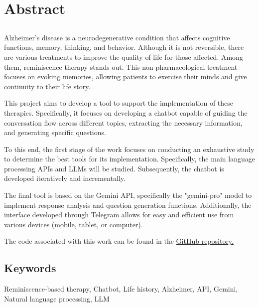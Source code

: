 \chapter*{Abstract}
\section*{\tituloPortadaVal}
Alzheimer's disease is a neurodegenerative condition that affects cognitive functions, memory, thinking, and behavior. Although it is not reversible, there are various treatments to improve the quality of life for those affected. Among them, reminiscence therapy stands out. This non-pharmacological treatment focuses on evoking memories, allowing patients to exercise their minds and give continuity to their life story.

This project aims to develop a tool to support the implementation of these therapies. Specifically, it focuses on developing a chatbot capable of guiding the conversation flow across different topics, extracting the necessary information, and generating specific questions.

To this end, the first stage of the work focuses on conducting an exhaustive study to determine the best tools for its implementation. Specifically, the main language processing APIs and LLMs will be studied. Subsequently, the chatbot is developed iteratively and incrementally.

The final tool is based on the Gemini API, specifically the "gemini-pro" model to implement response analysis and question generation functions. Additionally, the interface developed through Telegram allows for easy and efficient use from various devices (mobile, tablet, or computer).

The code associated with this work can be found in the \href{https://github.com/mavice07/TFG-ChatBotCantor.git}{GitHub repository.}

\section*{Keywords}

\noindent Reminiscence-based therapy, Chatbot, Life history, Alzheimer, API, Gemini, Natural language processing, LLM



